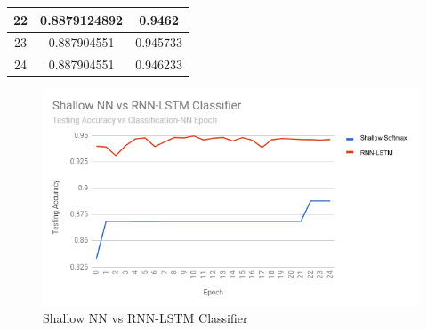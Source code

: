 \documentclass[a4paper]{article}
\begin{document}
\begin{center}
\begin{tabular}{||c c c||}
 \hline
22&
0.8879124892&
0.9462\\ 
 \hline
23&
0.887904551&
0.945733\\ 
 \hline
24&
0.887904551&
0.946233\\ 
 \hline
\end{tabular}
\begin{figure}[h]
\includegraphics{shallowVsRnn}\caption{Shallow NN vs RNN-LSTM Classifier}\label{fig:XSS}
\end{figure}
\end{center}
\pagebreak
\end{document}
